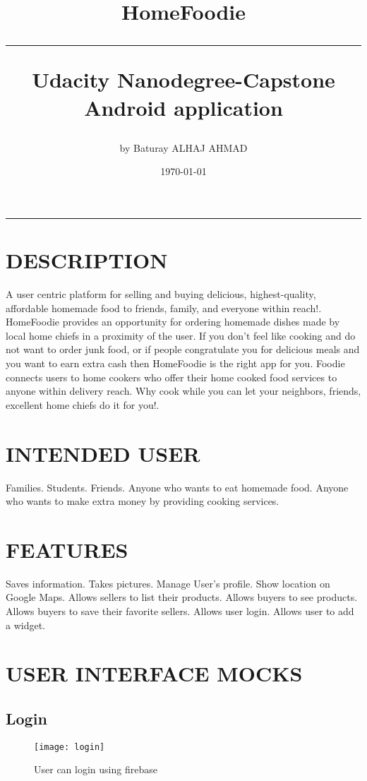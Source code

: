 \documentclass{article}
\title{%
  \bfseries{HomeFoodie}\\
  \rule{8cm}{0.2pt}
  \linebreak[10pt]
  \large Udacity Nanodegree-Capstone \\
  \large Android application\\}
\date{\today}
\author{by Baturay ALHAJ AHMAD}
\begin{document}
  \maketitle
  \hrule

  \pagebreak


\tableofcontents
\pagebreak
\section{DESCRIPTION}
  A user centric platform for selling and buying delicious, highest-quality, affordable homemade food to friends, family, and everyone within reach!.
  HomeFoodie provides an opportunity for ordering homemade dishes made by local home chiefs in a proximity of the user.
  If you don’t feel like cooking and do not want to order junk food, or if people congratulate you for delicious meals and you want to earn extra cash then HomeFoodie is the right app for you. Foodie connects users to home cookers who offer their home cooked food services to anyone within delivery reach. Why cook while you can let your neighbors, friends, excellent home chiefs do it for you!.

\section{INTENDED USER}
  Families.
  Students.
  Friends.
  Anyone who wants to eat homemade food.
  Anyone who wants to make extra money by providing cooking services.


\section{FEATURES}
  Saves information. 
  Takes pictures.
  Manage User’s profile.
  Show location on Google Maps.
  Allows sellers to list their products.
  Allows buyers to see products.
  Allows buyers to save their favorite sellers.
  Allows user login.
  Allows user to add a widget.


\section{USER INTERFACE MOCKS}
  \subsection{Login}
  \begin{figure}[ht]
    \centering
    \texttt{[image: login]}
    \caption{User can login using firebase}
    \label{fig:login}
  \end{figure}
\end{document}
